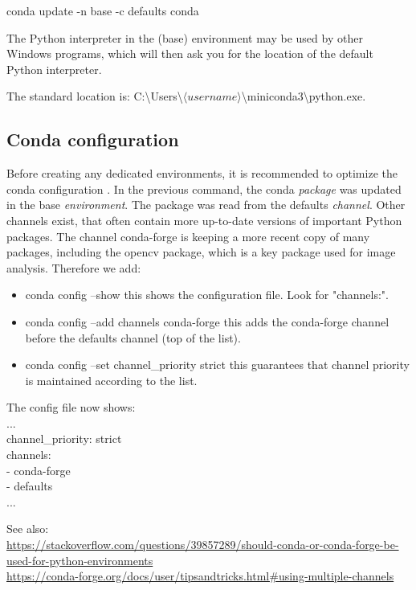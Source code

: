 \textsf{conda update -n base -c defaults conda}

The Python interpreter in the \textsf{(base)} environment may be used by other Windows programs, which will then ask you for the location of the default Python interpreter.

The standard location is: \textsf{C:\textbackslash Users\textbackslash $\langle username\rangle$\textbackslash miniconda3\textbackslash python.exe}.

\subsection{Conda configuration}
\label{appendix:config}

Before creating any dedicated environments, it is recommended to optimize the \textsf{conda} configuration \cite{stack_channels, stack_multiple}. In the previous command, the \textsf{conda} \emph{package} was updated in the \textsf{base} \emph{environment}. The package was read from the \textsf{defaults} \emph{channel}. Other channels exist, that often contain more up-to-date versions of important Python packages. The channel \textsf{conda-forge} is keeping a more recent copy of many packages, including the \textsf{opencv} package, which is a key package used for image analysis. Therefore we add:

\begin{itemize}
	\item \textsf{conda config --show} \qquad this shows the configuration file. Look for "channels:".

    \item \textsf{conda config --add channels conda-forge} \qquad this adds the conda-forge channel before the defaults channel (top of the list).

    \item \textsf{conda config --set channel\_priority strict} \qquad this guarantees that channel priority is maintained according to the list.
\end{itemize}

The config file now shows: \\
... \\
\textsf{channel\_priority: strict \\
	channels: \\
	- conda-forge \\
	- defaults} \\
...

See also: \\
\url{https://stackoverflow.com/questions/39857289/should-conda-or-conda-forge-be-used-for-python-environments} \\
\url{https://conda-forge.org/docs/user/tipsandtricks.html#using-multiple-channels} \\

